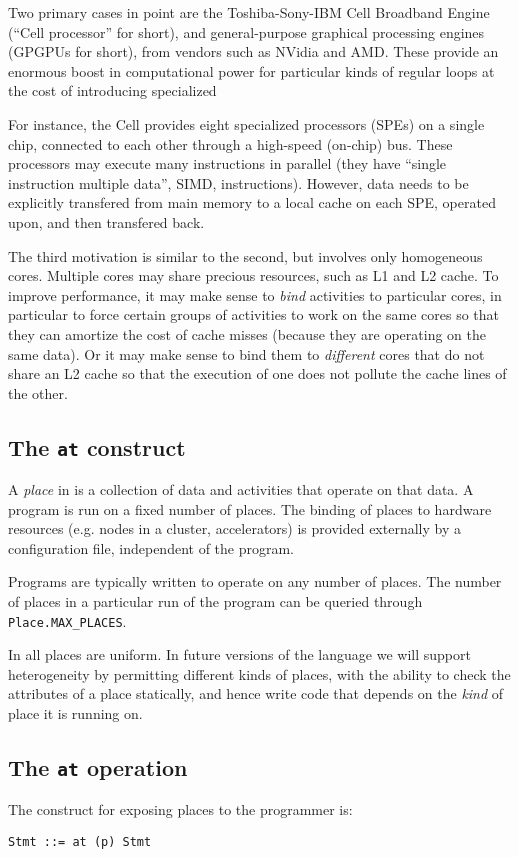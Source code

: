 Two primary cases in point are the Toshiba-Sony-IBM Cell Broadband
Engine (``Cell processor'' for short), and general-purpose graphical
processing engines (GPGPUs for short), from vendors such as NVidia and
AMD. These provide an enormous boost in computational power for
particular kinds of regular loops at the cost of introducing
specialized

For instance, the Cell provides eight specialized processors (SPEs) on
a single chip, connected to each other through a high-speed (on-chip)
bus. These processors may execute many instructions in parallel (they
have ``single instruction multiple data'', SIMD,
instructions). However, data needs to be explicitly transfered from
main memory to a local cache on each SPE, operated upon, and then
transfered back.

The third motivation is similar to the second, but involves only
homogeneous cores. Multiple cores may share precious resources, such
as L1 and L2 cache. To improve performance, it may make sense to {\em
bind} activities to particular cores, in particular to force certain
groups of activities to work on the same cores so that they can
amortize the cost of cache misses (because they are operating on the
same data). Or it may make sense to bind them to {\em different} cores
that do not share an L2 cache so that the execution of one does not
pollute the cache lines of the other.

\subsection{The {\tt at} construct}

A {\em place} in \Xten{} is a collection of data and activities that
operate on that data. A program is run on a fixed number of
places. The binding of places to hardware resources (e.g. nodes in a
cluster, accelerators) is provided externally by a configuration file,
independent of the program. 

Programs are typically written to operate on any number of places. The
number of places in a particular run of the program can be queried
through {\tt Place.MAX\_PLACES}. 

In \XtenCurrVer{}  all places are uniform. In future versions of the
language we will support heterogeneity by permitting different kinds
of places, with the ability to check the attributes of a place
statically, and hence write code that depends on the {\em kind} of
place it is running on.


\subsection{The {\tt at} operation}
The construct for exposing places to the programmer is:
{\footnotesize
\begin{verbatim}
Stmt ::= at (p) Stmt
\end{verbatim}}

